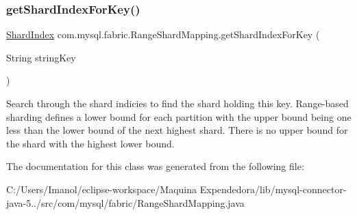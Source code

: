 \subsubsection{\texorpdfstring{get\+Shard\+Index\+For\+Key()}{getShardIndexForKey()}}
{\footnotesize\ttfamily \mbox{\hyperlink{classcom_1_1mysql_1_1fabric_1_1_shard_index}{Shard\+Index}} com.\+mysql.\+fabric.\+Range\+Shard\+Mapping.\+get\+Shard\+Index\+For\+Key (\begin{DoxyParamCaption}\item[{String}]{string\+Key }\end{DoxyParamCaption})\hspace{0.3cm}{\ttfamily [protected]}}

Search through the shard indicies to find the shard holding this key. Range-\/based sharding defines a lower bound for each partition with the upper bound being one less than the lower bound of the next highest shard. There is no upper bound for the shard with the highest lower bound. 

The documentation for this class was generated from the following file\+:\begin{DoxyCompactItemize}
\item 
C\+:/\+Users/\+Imanol/eclipse-\/workspace/\+Maquina Expendedora/lib/mysql-\/connector-\/java-\/5../src/com/mysql/fabric/Range\+Shard\+Mapping.\+java\end{DoxyCompactItemize}
